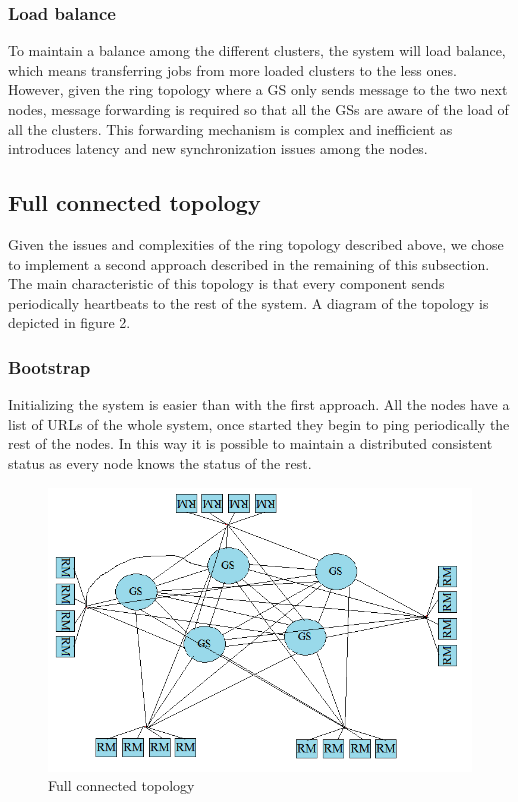 \subsubsection{Load balance}
To maintain a balance among the different clusters, the system will load balance, which means transferring jobs from more loaded clusters to the less ones. However, given the ring topology where a GS only sends message to the two next nodes, message forwarding is required so that all the GSs are aware of the load of all the clusters. This forwarding mechanism is complex and inefficient as introduces latency and new synchronization issues among the nodes.

\subsection{Full connected topology}
Given the issues and complexities of the ring topology described above, we chose to implement a second approach described in the remaining of this subsection. The main characteristic of this topology is that every component sends periodically heartbeats to the rest of the system. A diagram of the topology is depicted in figure 2.

\subsubsection{Bootstrap}
Initializing the system is easier than with the first approach. All the nodes have a list of URLs of the whole system, once started they begin to ping periodically the rest of the nodes. In this way it is possible to maintain a distributed consistent status as every node knows the status of the rest.

\begin{figure}
\centering
	\includegraphics[scale=0.61]{full.png}
	\caption{Full connected topology}
\end{figure}

